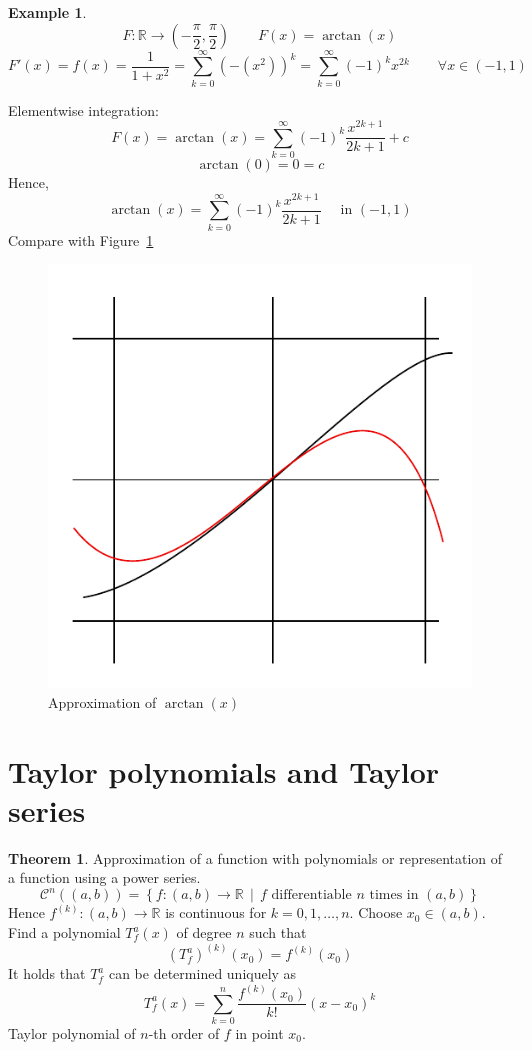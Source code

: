 \documentclass[a4paper,landscape,twocolumn]{article}
\theoremstyle{definition}
\newtheorem{theorem}{Theorem}
\newtheorem{ex}{Example}
\newcommand\setdef[2]{\left\{#1\,\middle|\,#2\right\}}
\begin{document}
\begin{ex}
  \[ F: \mathbb R \to \left(-\frac\pi2, \frac\pi2\right) \qquad F(x) = \arctan(x) \]
  \[
    F'(x) = f(x) = \frac{1}{1 + x^2}
    = \sum_{k=0}^\infty \left(-(x^2)\right)^k = \sum_{k=0}^\infty (-1)^k x^{2k}
    \qquad \forall x \in (-1, 1)
  \]

  Elementwise integration:
  \[ F(x) = \arctan(x) = \sum_{k=0}^\infty (-1)^k \frac{x^{2k+1}}{2k + 1} + c \]
  \[ \arctan(0) = 0 = c \]
  Hence,
  \[ \arctan(x) = \sum_{k=0}^\infty (-1)^k \frac{x^{2k+1}}{2k + 1} \quad \text{ in } (-1, 1) \]
  Compare with Figure~\ref{img:arctan-approx}
\end{ex}

\begin{figure}[!h]
  \begin{center}
    \includegraphics{img/approximation_of_arctan.pdf}
    \caption{Approximation of $\arctan(x)$}
    \label{img:arctan-approx}
  \end{center}
\end{figure}

\section{Taylor polynomials and Taylor series}
%
\begin{theorem}
  Approximation of a function with polynomials or representation
  of a function using a power series.
  \[
    \mathcal C^n((a,b))
    = \setdef{f: (a,b) \to \mathbb R}{f \text{ differentiable $n$ times in } (a,b)}
  \]
  Hence $f^{(k)}: (a,b) \to \mathbb R$ is continuous for $k = 0, 1, \ldots, n$.
  Choose $x_0 \in (a,b)$.
  Find a polynomial $T_f^a(x)$ of degree $n$ such that
  \[ \left(T_f^a\right)^{(k)}(x_0) = f^{(k)}(x_0) \]
  It holds that $T_f^a$ can be determined uniquely as
  \[ T_f^a(x) = \sum_{k=0}^n \frac{f^{(k)}(x_0)}{k!} (x - x_0)^k \]
  Taylor polynomial of $n$-th order of $f$ in point $x_0$.
\end{theorem}
\end{document}
